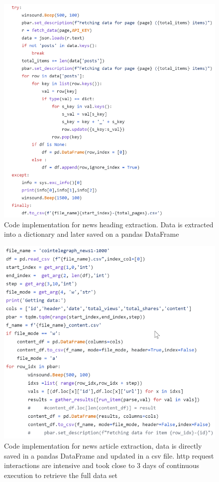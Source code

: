 \begin{figure}[H]
   \centering
   \includegraphics[width=\linewidth]{fig/CodeSnippetNewsHeading.png}
    \caption{Code implementation for news heading extraction. Data is extracted into a dictionary and later saved on a pandas DataFrame}
    \label{fig:CodeSnippetNewsHeading}
\end{figure}

\begin{figure}[H]
   \centering
   \includegraphics[width=\linewidth]{fig/CodeSnippetNewsContent.png}
    \caption{Code implementation for news article extraction, data is directly saved in a pandas DataFrame and updated in a csv file. http request interactions are intensive and took close to 3 days of continuous execution to retrieve the full data set}
    \label{fig:CodeSnippetNewsContent}
\end{figure}

